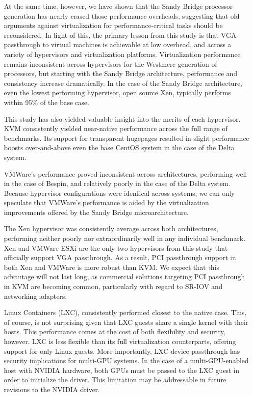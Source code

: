 At the same time, however, we have shown that the Sandy Bridge
processor generation has nearly erased those performance overheads, suggesting
that old arguments against virtualization for performance-critical tasks should
be reconsidered.  In light of this, the primary lesson from this study is that VGA-passthrough to
virtual machines is achievable at low overhead, and across a variety of
hypervisors and virtualization platforms.  Virtualization performance remains
inconsistent across hypervisors for the Westmere generation of processors, but
starting with the Sandy Bridge architecture, performance and consistency
increase dramatically.  In the case of the Sandy Bridge architecture, even the lowest performing hypervisor, open source Xen, typically
performs within 95\% of the base case.

This study has also yielded valuable insight into the merits of each hypervisor.
KVM consistently yielded near-native performance across the full range of
benchmarks.  Its support for transparent hugepages resulted in slight
performance boosts over-and-above even the base CentOS system in the case of the
Delta system.  


VMWare's performance proved inconsistent across architectures, performing well
in the case of Bespin, and relatively poorly in the case of the Delta system.
Because hypervisor configurations were identical across systems, we can only speculate that
VMWare's performance is aided by the virtualization improvements offered by the
Sandy Bridge microarchitecture.  

The Xen hypervisor was consistently average across both architectures,
performing neither poorly nor extraordinarily well in any individual benchmark.
Xen and VMWare ESXi are the only two hypervisors from this study that officially support VGA
passthrough.  As a result, PCI passthrough support in both Xen and VMWare is
more robust than KVM.  We expect that this advantage will not last long, as
commercial solutions targeting PCI passthrough in KVM are becoming
common, particularly with regard to SR-IOV and networking adapters.

Linux Containers (LXC), consistently performed closest to the native case.
This, of course, is not surprising given that LXC guests share a
single kernel with their hosts.  This performance comes at the cost of both
flexibility and security, however.  LXC is less flexible than its full
virtualization counterparts, offering
support for only Linux guests.  More importantly, LXC device
passthrough has security implications for multi-GPU systems.  In the case of
a multi-GPU-enabled host with NVIDIA hardware, both GPUs must be passed to the
LXC guest in order to initialize the driver.  This limitation may be addressable
in future revisions to the NVIDIA driver. 


